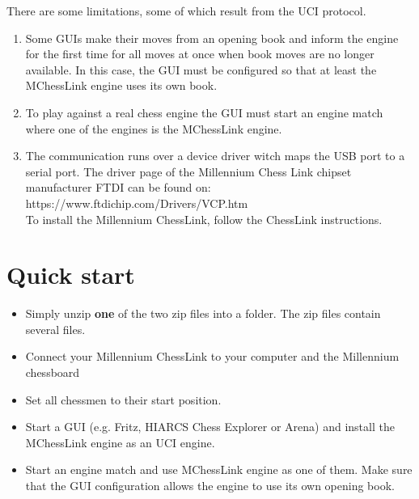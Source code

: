 \documentclass[11pt,a4paper]{article}
\begin{document}
There are some limitations, some of which result from the UCI protocol.
\begin{enumerate}
	\item Some GUIs make their moves from an opening book and inform the engine for the first time for all moves at once when book moves are no longer available. In this case, the GUI must be configured so that at least the MChessLink engine uses its own book.
	\item To play against a real chess engine the GUI must start an engine match where one of the engines is the MChessLink engine.
	\item The communication runs over a device driver witch maps the USB port to a serial port. The driver page of the Millennium Chess Link chipset manufacturer FTDI can be found on: \\ https://www.ftdichip.com/Drivers/VCP.htm
	\\To install the Millennium ChessLink, follow the ChessLink instructions.
\end{enumerate}
\pagebreak

\section{Quick start}
\begin{itemize}
	\item Simply unzip \textbf{one} of the two zip files into a folder. The zip files contain several files.
  
	\item Connect your Millennium ChessLink to your computer and the Millennium chessboard
	\item Set all chessmen to their start position.
	\item Start a GUI (e.g. Fritz, HIARCS Chess Explorer or Arena) and install the MChessLink engine as an UCI engine.
	\item Start an engine match and use MChessLink engine as one of them. Make sure that the GUI configuration allows the engine to use its own opening book.
\end{itemize}
\end{document}

